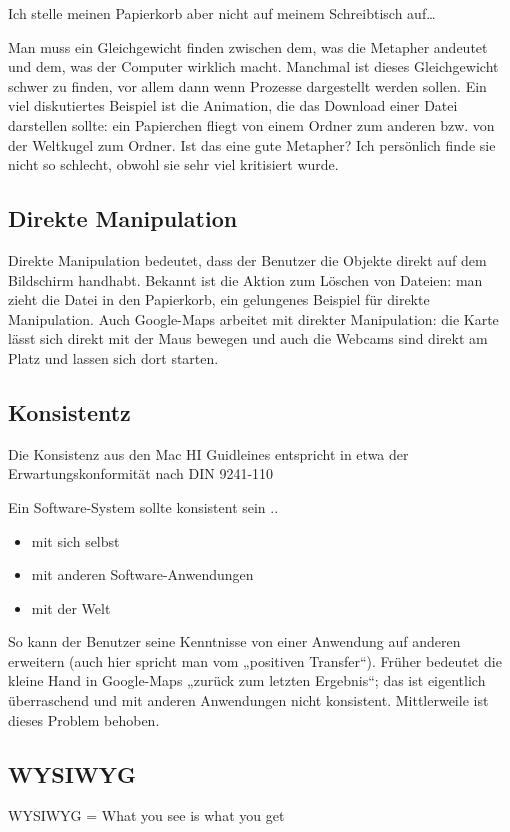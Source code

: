 Ich stelle meinen Papierkorb aber nicht auf meinem Schreibtisch auf…

Man muss ein Gleichgewicht finden zwischen dem, was die Metapher andeutet und dem, was der Computer wirklich macht. Manchmal ist dieses Gleichgewicht schwer zu finden, vor allem dann wenn Prozesse dargestellt werden sollen. Ein viel diskutiertes Beispiel ist die Animation, die das Download einer Datei darstellen sollte: ein Papierchen fliegt von einem Ordner zum anderen bzw. von der Weltkugel zum Ordner. Ist das eine gute Metapher? Ich persönlich finde sie nicht so schlecht, obwohl sie sehr viel kritisiert wurde.


\subsection{Direkte Manipulation}
Direkte Manipulation bedeutet, dass der Benutzer die Objekte direkt auf dem Bildschirm handhabt. Bekannt ist die Aktion zum Löschen von Dateien: man zieht die Datei in den Papierkorb, ein gelungenes Beispiel für direkte Manipulation.
Auch Google-Maps arbeitet mit direkter Manipulation: die Karte lässt sich direkt mit der Maus bewegen und auch die Webcams sind direkt am Platz und lassen sich dort starten. 


\subsection{Konsistentz}
Die Konsistenz aus den Mac HI Guidleines entspricht in etwa der Erwartungskonformität nach DIN 9241-110

Ein Software-System sollte konsistent sein ..
\begin{itemize}
\item mit sich selbst
\item mit anderen Software-Anwendungen
\item mit der Welt
\end{itemize}

So kann der Benutzer seine Kenntnisse von einer Anwendung auf anderen erweitern (auch hier spricht man vom „positiven Transfer“).
Früher bedeutet die kleine Hand in Google-Maps „zurück zum letzten Ergebnis“; das ist eigentlich überraschend und mit anderen Anwendungen nicht konsistent. Mittlerweile ist dieses Problem behoben.
\subsection{WYSIWYG}
WYSIWYG = What you see is what you get

